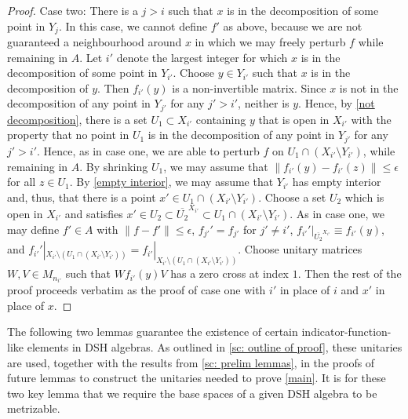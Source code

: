 \documentclass[12pt]{amsart}
\numberwithin{equation}{section}
\theoremstyle{definition}
\theoremstyle{remark}
\begin{document}
\begin{proof}
	Case two: There is a $j>i$ such that $x$ is in the decomposition of some point in $Y_{j}$. In this case, we cannot define $f'$ as above, because we are not guaranteed a neighbourhood around $x$ in which we may freely perturb $f$ while remaining in $A$. Let $i'$ denote the largest integer for which $x$ is in the decomposition of some point in $Y_{i'}$. Choose $y\in Y_{i'}$ such that $x$ is in the decomposition of $y$. Then $f_{i'}(y)$ is a non-invertible matrix. Since $x$ is not in the decomposition of any point in $Y_{j'}$ for any $j'>i'$, neither is $y$. Hence, by \autoref{not decomposition}, there is a set $U_{1}\subset X_{i'}$ containing $y$ that is open in $X_{i'}$ with the property that no point in $U_{1}$ is in the decomposition of any point in $Y_{j'}$ for any $j'>i'$. Hence, as in case one, we are able to perturb $f$ on $U_{1}\cap (X_{i'}\setminus Y_{i'})$, while remaining in $A$.  By shrinking $U_{1}$, we may assume that $\|f_{i'}(y)-f_{i'}(z)\|\leq \epsilon$ for all $z\in U_{1}$. By \autoref{empty interior}, we may assume that $Y_{i'}$ has empty interior and, thus, that there is a point $x'\in U_{1}\cap (X_{i'}\setminus Y_{i'})$. Choose a set $U_{2}$ which is open in $X_{i'}$ and satisfies $x'\in U_{2}\subset\overline{U_{2}}^{X_{i'}}\subset U_{1}\cap(X_{i'}\setminus Y_{i'})$. As in case one, we may define $f'\in A$ with $\|f-f'\|\leq \epsilon$, $f_{j'}'=f_{j'}$ for $j'\not=i'$, $f_{i'}'|_{\overline{U_{2}}^{X_{i'}}}\equiv f_{i'}(y)$, and $f_{i'}'|_{X_{i'}\setminus(U_{1}\cap (X_{i'}\setminus Y_{i'}))}=f_{i'}|_{X_{i'}\setminus(U_{1}\cap (X_{i'}\setminus Y_{i'}))}$. Choose unitary matrices $W,V\in M_{n_{i'}}$ such that $Wf_{i'}(y)V$ has a zero cross at index $1$. Then the rest of the proof proceeds verbatim as the proof of case one with $i'$ in place of $i$ and $x'$ in place of $x$. 
\end{proof}

The following two lemmas guarantee the existence of certain indicator-function-like elements in DSH algebras. As outlined in \cref{sc: outline of proof}, these unitaries are used, together with the results from \cref{sc: prelim lemmas}, in the proofs of future lemmas to construct the unitaries needed to prove \autoref{main}. It is for these two key lemma that we require the base spaces of a given DSH algebra to be metrizable.
\end{document}
